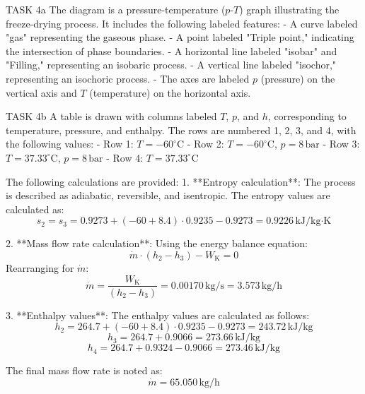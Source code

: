 TASK 4a  
The diagram is a pressure-temperature (\(p\)-\(T\)) graph illustrating the freeze-drying process. It includes the following labeled features:  
- A curve labeled "gas" representing the gaseous phase.  
- A point labeled "Triple point," indicating the intersection of phase boundaries.  
- A horizontal line labeled "isobar" and "Filling," representing an isobaric process.  
- A vertical line labeled "isochor," representing an isochoric process.  
- The axes are labeled \(p\) (pressure) on the vertical axis and \(T\) (temperature) on the horizontal axis.  

TASK 4b  
A table is drawn with columns labeled \(T\), \(p\), and \(h\), corresponding to temperature, pressure, and enthalpy. The rows are numbered 1, 2, 3, and 4, with the following values:  
- Row 1: \(T = -60^\circ\text{C}\)  
- Row 2: \(T = -60^\circ\text{C}\), \(p = 8 \, \text{bar}\)  
- Row 3: \(T = 37.33^\circ\text{C}\), \(p = 8 \, \text{bar}\)  
- Row 4: \(T = 37.33^\circ\text{C}\)  

The following calculations are provided:  
1. **Entropy calculation**:  
   The process is described as adiabatic, reversible, and isentropic. The entropy values are calculated as:  
   \[
   s_2 = s_3 = 0.9273 + \left(-60 + 8.4\right) \cdot 0.9235 - 0.9273 = 0.9226 \, \text{kJ/kg·K}
   \]

2. **Mass flow rate calculation**:  
   Using the energy balance equation:  
   \[
   \dot{m} \cdot (h_2 - h_3) - W_{\text{K}} = 0
   \]  
   Rearranging for \(\dot{m}\):  
   \[
   \dot{m} = \frac{W_{\text{K}}}{(h_2 - h_3)} = 0.00170 \, \text{kg/s} = 3.573 \, \text{kg/h}
   \]

3. **Enthalpy values**:  
   The enthalpy values are calculated as follows:  
   \[
   h_2 = 264.7 + \left(-60 + 8.4\right) \cdot 0.9235 - 0.9273 = 243.72 \, \text{kJ/kg}
   \]  
   \[
   h_3 = 264.7 + 0.9066 = 273.66 \, \text{kJ/kg}
   \]  
   \[
   h_4 = 264.7 + 0.9324 - 0.9066 = 273.46 \, \text{kJ/kg}
   \]  

The final mass flow rate is noted as:  
\[
\dot{m} = 65.050 \, \text{kg/h}
\]